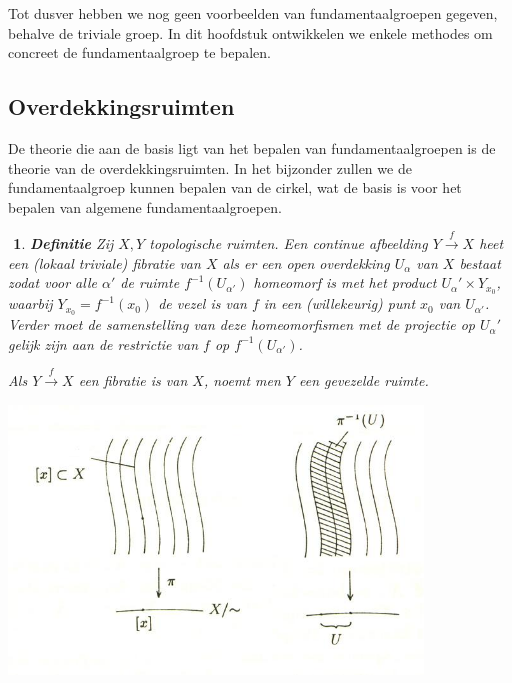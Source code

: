 \documentclass[12pt]{book}
\newtheorem{dfh}[stelh]{$\!\!$}
\newenvironment{df}{\begin{dfh} \em {\bf Definitie }}{\end{dfh}}
\begin{document}
Tot dusver hebben we nog geen voorbeelden van fundamentaalgroepen gegeven, behalve de triviale groep. In dit hoofdstuk ontwikkelen we enkele methodes om concreet de fundamentaalgroep te bepalen.




\subsection{Overdekkingsruimten}\label{section:overdekking}

De theorie die aan de basis ligt van het bepalen van fundamentaalgroepen is de theorie van de overdekkingsruimten. In het bijzonder zullen we de fundamentaalgroep kunnen bepalen van de cirkel, wat de basis is voor het bepalen van algemene fundamentaalgroepen.


\begin{df} Zij $X, Y$ topologische ruimten. Een continue afbeelding 
$Y\stackrel{f}{\to} X$ heet een (lokaal triviale)  {\em fibratie} van $X$ als er een open overdekking $U_{\alpha}$ van $X$ bestaat zodat voor alle $\alpha'$ de ruimte $f^{-1}(U_{\alpha'})$ homeomorf
is met het product $U_\alpha' \times Y_{x_{0}}$, waarbij $Y_{x_{0}}=f^{-1}(x_{0})$ de vezel is van $f$ in een (willekeurig) punt $x_0$ van $U_{\alpha'}$. Verder moet de samenstelling van deze homeomorfismen met de projectie op $U_\alpha'$ gelijk zijn aan de restrictie van $f$ op $f^{-1}(U_{\alpha'})$.

Als $Y\stackrel{f}{\to} X$ een fibratie is van $X$, noemt men $Y$ een {\em gevezelde ruimte}.
\end{df}

\begin{center}
\includegraphics[width=11cm]{images/qrvoor.jpg}
\end{center}
\end{document}
